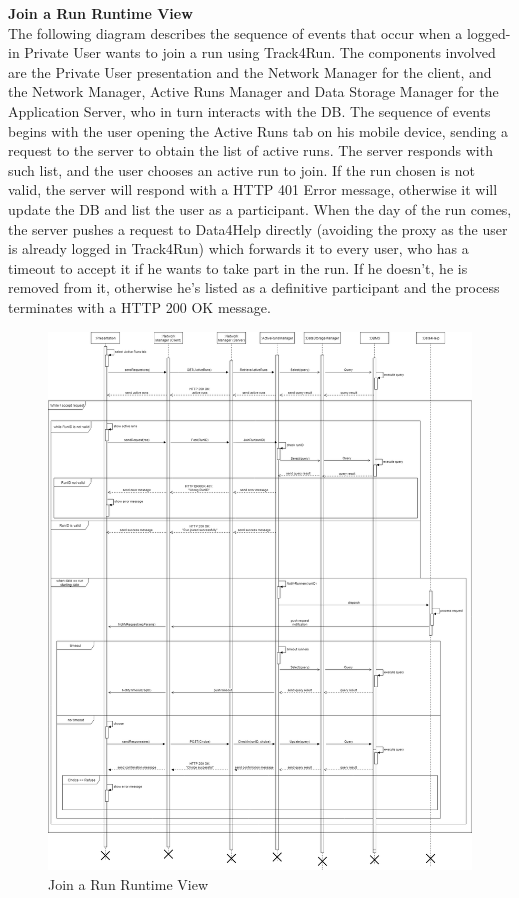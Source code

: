 \documentclass[titlepage]{article}
\begin{document}
{\bf Join a Run Runtime View }\\ 
The following diagram describes the sequence of events that occur when a logged-in Private User wants to join a run using Track4Run.
The components involved are the Private User presentation and the Network Manager for the client, and the Network Manager, Active Runs Manager and Data Storage Manager for the Application Server, who in turn interacts with the DB.
The sequence of events begins with the user opening the Active Runs tab on his mobile device, sending a request to the server to obtain the list of active runs. The server responds with such list, and the user chooses an active run to join. If the run chosen is not valid, the server will respond with a HTTP 401 Error message, otherwise it will update the DB and list the user as a participant.
When the day of the run comes, the server pushes a request to Data4Help directly (avoiding the proxy as the user is already logged in Track4Run) which forwards it to every user, who has a timeout to accept it if he wants to take part in the run. If he doesn’t, he is removed from it, otherwise he’s listed as a definitive participant and the process terminates with a HTTP 200 OK message.

\begin{figure}[H]
	\center
  	\includegraphics[width=15cm]{Join.png}
  	\caption{Join a Run Runtime View}
 	\label{fig:JOIN}
\end{figure}
\end{document}
